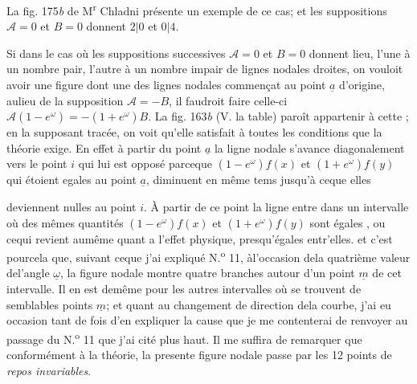 \documentclass[11pt,a4paper]{article}
\begin{document}
La fig. 175\emph{b} de M\textsuperscript{r} Chladni présente un exemple
de ce cas;  et les suppositions $\mathcal{A}=0$ et $B=0$
donnent  $2|0$ et $0|4$.

Si dans le cas où les suppositions successives
$\mathcal{A}=0$ et $B=0$ donnent lieu, l'une à un
nombre pair, l'autre à un nombre impair
de lignes nodales droites, on vouloit avoir
une figure dont une des lignes nodales commençat
au point $\underline{a}$ d'origine, aulieu de la supposition
$\mathcal{A}=-B$, il faudroit faire celle-ci
$\mathcal{A}(1-e^{\omega}) = -(1+e^{\omega})B$. La fig. 163\emph{b} (V. la table)
paroît appartenir à cette  ;  en la supposant
tracée, on voit qu'elle satisfait à toutes les conditions
que la théorie exige. En effet à partir du point
$\underline{a}$ la ligne nodale s'avance diagonalement vers le point
$i$ qui lui est opposé parceque 
  $(1-e^{\omega})f(x)$ et $(1+e^{\omega})f(y)$ qui étoient egales au
point $\underline{a}$, diminuent en même tems jusqu'à ceque elles 


deviennent nulles   au point $i$. À partir de ce point
la ligne entre dans un intervalle où  des mêmes quantités
$(1-e^{\omega})f(x)$ et $(1+e^{\omega})f(y)$ sont égales , ou cequi revient aumême
quant a l'effet physique, presqu'égales entr'elles. et c'est pourcela
que, suivant ceque j'ai expliqué N.\textsuperscript{o} 11, àl'occasion
dela quatrième valeur del'angle $\underline{\omega}$, la figure nodale
montre quatre branches autour d'un point $\underline{m}$ de cet
intervalle. Il en est demême pour les autres intervalles
où se trouvent de semblables points $\underline{m}$; et quant au
changement de direction dela courbe, j'ai eu
occasion tant de fois d'en expliquer la cause que
je me contenterai de renvoyer 
 au passage du N.\textsuperscript{o} 11 que j'ai cité plus
haut.  Il me suffira  de remarquer que conformément
à la théorie, la presente figure nodale passe par
les 12 points de \emph{repos invariables}.
\end{document}
